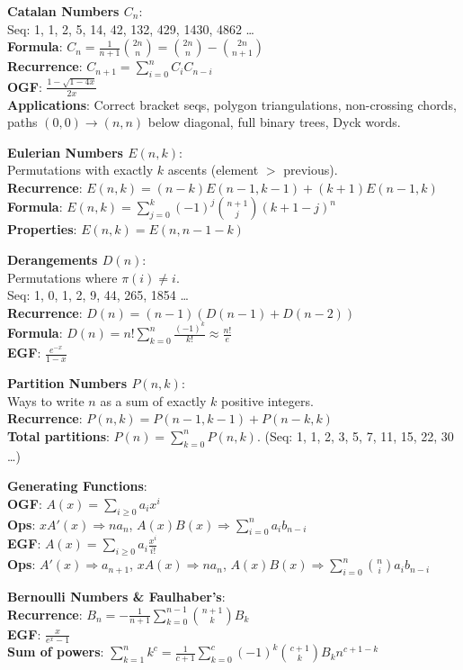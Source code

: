 \textbf{Catalan Numbers $C_n$}: \\
Seq: 1, 1, 2, 5, 14, 42, 132, 429, 1430, 4862 \dots \\
\textbullet{} \textbf{Formula}: $C_n = \frac{1}{n+1} \binom{2n}{n} = \binom{2n}{n} - \binom{2n}{n+1}$ \\
\textbullet{} \textbf{Recurrence}: $C_{n+1} = \sum_{i=0}^n C_i C_{n-i}$ \\
\textbullet{} \textbf{OGF}: $\frac{1-\sqrt{1-4x}}{2x}$ \\
\textbullet{} \textbf{Applications}: Correct bracket seqs, polygon triangulations, non-crossing chords, paths $(0,0) \to (n,n)$ below diagonal, full binary trees, Dyck words.

\textbf{Eulerian Numbers $E(n,k)$}: \\
Permutations with exactly $k$ ascents (element $>$ previous). \\
\textbullet{} \textbf{Recurrence}: $E(n,k) = (n-k)E(n-1, k-1) + (k+1)E(n-1, k)$ \\
\textbullet{} \textbf{Formula}: $E(n,k) = \sum_{j=0}^k (-1)^j \binom{n+1}{j} (k+1-j)^n$ \\
\textbullet{} \textbf{Properties}: $E(n,k) = E(n, n-1-k)$

\textbf{Derangements $D(n)$}: \\
Permutations where $\pi(i) \neq i$. \\
Seq: 1, 0, 1, 2, 9, 44, 265, 1854 \dots \\
\textbullet{} \textbf{Recurrence}: $D(n) = (n-1)(D(n-1) + D(n-2))$ \\
\textbullet{} \textbf{Formula}: $D(n) = n! \sum_{k=0}^n \frac{(-1)^k}{k!} \approx \frac{n!}{e}$ \\
\textbullet{} \textbf{EGF}: $\frac{e^{-x}}{1-x}$

\textbf{Partition Numbers $P(n,k)$}: \\
Ways to write $n$ as a sum of exactly $k$ positive integers. \\
\textbullet{} \textbf{Recurrence}: $P(n,k) = P(n-1, k-1) + P(n-k, k)$ \\
\textbullet{} \textbf{Total partitions}: $P(n) = \sum_{k=0}^n P(n,k)$. (Seq: 1, 1, 2, 3, 5, 7, 11, 15, 22, 30 \dots)

\textbf{Generating Functions}: \\
\textbullet{} \textbf{OGF}: $A(x) = \sum_{i \ge 0} a_i x^i$ \\
\textbullet{} \textbf{Ops}: $xA'(x) \Rightarrow n a_n$, $A(x)B(x) \Rightarrow \sum_{i=0}^n a_i b_{n-i}$ \\
\textbullet{} \textbf{EGF}: $A(x) = \sum_{i \ge 0} a_i \frac{x^i}{i!}$ \\
\textbullet{} \textbf{Ops}: $A'(x) \Rightarrow a_{n+1}$, $xA(x) \Rightarrow n a_n$, $A(x)B(x) \Rightarrow \sum_{i=0}^n \binom{n}{i} a_i b_{n-i}$

\textbf{Bernoulli Numbers \& Faulhaber's}: \\
\textbullet{} \textbf{Recurrence}: $B_n = -\frac{1}{n+1} \sum_{k=0}^{n-1} \binom{n+1}{k} B_k$ \\
\textbullet{} \textbf{EGF}: $\frac{x}{e^x-1}$ \\
\textbullet{} \textbf{Sum of powers}: $\sum_{k=1}^n k^c = \frac{1}{c+1} \sum_{k=0}^c (-1)^k \binom{c+1}{k} B_k n^{c+1-k}$
